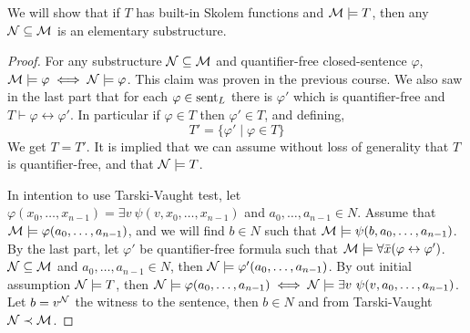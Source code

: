 \subquestion{}
We will show that if $T$ has built-in Skolem functions and $\mathcal{M} \models T$, then any $\mathcal{N} \subseteq \mathcal{M}$ is an elementary substructure.
\begin{proof}
	For any substructure $\mathcal{N} \subseteq \mathcal{M}$ and quantifier-free closed-sentence $\varphi$, $\mathcal{M} \models \varphi \iff \mathcal{N} \models \varphi$.
	This claim was proven in the previous course.
	We also saw in the last part that for each $\varphi \in \operatorname{sent}_L$ there is $\varphi'$ which is quantifier-free and $T \vdash \varphi \leftrightarrow \varphi'$.
	In particular if $\varphi \in T$ then $\varphi' \in T$, and defining,
	\[
		T'
		= \{ \varphi' \mid \varphi \in T \}
	\]
	We get $T = T'$.
	It is implied that we can assume without loss of generality that $T$ is quantifier-free, and that $\mathcal{N} \models T$.

	In intention to use Tarski-Vaught test,
	let $\varphi(x_0, \ldots, x_{n - 1}) = \exists v\ \psi(v, x_0, \ldots, x_{n - 1})$ and $a_0, \ldots, a_{n - 1} \in N$.
	Assume that $\mathcal{M} \models \varphi(a_0, \ldots, a_{n - 1})$, and we will find $b \in N$ such that $\mathcal{M} \models \psi(b, a_0, \ldots, a_{n - 1})$. \\
	By the last part, let $\varphi'$ be quantifier-free formula such that $\mathcal{M} \models \forall \bar{x} (\varphi \leftrightarrow \varphi')$.
	$\mathcal{N} \subseteq \mathcal{M}$ and $a_0, \ldots, a_{n - 1} \in N$, then $\mathcal{N} \models \varphi'(a_0, \ldots, a_{n - 1})$.
	By out initial assumption $\mathcal{N} \models T$, then $\mathcal{N} \models \varphi(a_0, \ldots, a_{n - 1}) \iff \mathcal{N} \models \exists v\ \psi(v, a_0, \ldots, a_{n - 1})$.
	Let $b = v^{\mathcal{N}}$ the witness to the sentence, then $b \in N$ and from Tarski-Vaught $\mathcal{N} \prec \mathcal{M}$.
\end{proof}

